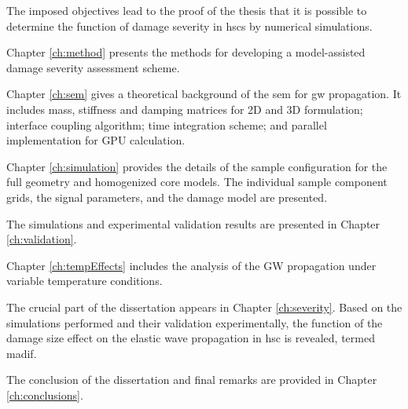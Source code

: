 The imposed objectives lead to the proof of the thesis that it is possible to determine the function of damage severity in \acp{hsc} by numerical simulations.

Chapter \ref{ch:method} presents the methods for developing a model-assisted damage severity assessment scheme.

Chapter \ref{ch:sem} gives a theoretical background of the \ac{sem} for \ac{gw} propagation.
It includes mass, stiffness and damping matrices for 2D and 3D formulation; interface coupling algorithm; time integration scheme; and parallel implementation for GPU calculation.

Chapter \ref{ch:simulation} provides the details of the sample configuration for the full geometry and homogenized core models. The individual sample component grids, the signal parameters, and the damage model are presented.

The simulations and experimental validation results are presented in Chapter \ref{ch:validation}.

Chapter \ref{ch:tempEffects} includes the analysis of the GW propagation under variable temperature conditions.

The crucial part of the dissertation appears in Chapter \ref{ch:severity}. Based on the simulations performed and their validation experimentally, the function of the damage size effect on the elastic wave propagation in \ac{hsc} is revealed, termed \ac{madif}.

The conclusion of the dissertation and final remarks are provided in Chapter \ref{ch:conclusions}.

